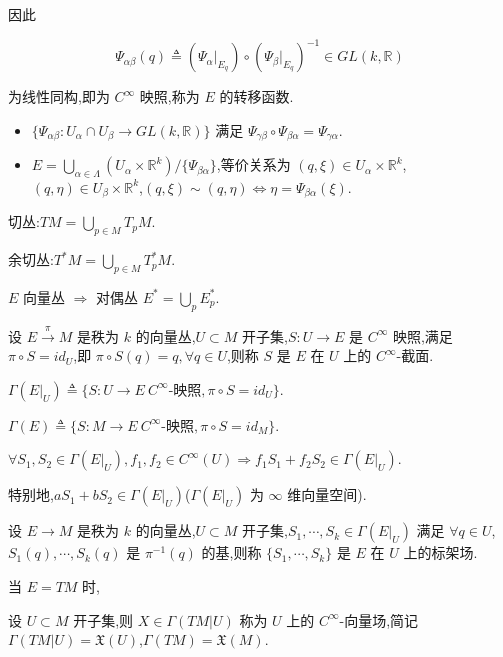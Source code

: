 因此

\[
\Psi_{\alpha \beta}(q) \triangleq \left( \Psi_\alpha |_{E_q} \right) \circ \left( \Psi_\beta |_{E_q} \right)^{-1} \in GL(k, \mathbb{R})
\]

为线性同构,即为 $C^\infty$ 映照,称为 $E$ 的转移函数.

\begin{itemize}
    \item $\{\Psi_{\alpha \beta} : U_\alpha \cap U_\beta \to GL(k, \mathbb{R})\}$ 满足 $\Psi_{\gamma \beta} \circ \Psi_{\beta \alpha} = \Psi_{\gamma \alpha}$.
    \item $E = \bigcup_{\alpha \in \Lambda} (U_\alpha \times \mathbb{R}^k)/\{\Psi_{\beta \alpha}\}$,等价关系为 $(q, \xi) \in U_\alpha \times \mathbb{R}^k$,$(q, \eta) \in U_\beta \times \mathbb{R}^k$,$(q, \xi) \sim (q, \eta) \iff \eta = \Psi_{\beta \alpha}(\xi)$.
\end{itemize}

切丛:$TM = \bigcup_{p \in M} T_pM$.

余切丛:$T^*M = \bigcup_{p \in M} T_p^*M$.

$E$ 向量丛 $\Rightarrow$ 对偶丛 $E^* = \bigcup_p E_p^*$.

\begin{definition}
设 $E \xrightarrow{\pi} M$ 是秩为 $k$ 的向量丛,$U \subset M$ 开子集,$S : U \to E$ 是 $C^\infty$ 映照,满足 $\pi \circ S = id_U$,即 $\pi \circ S(q) = q, \forall q \in U$,则称 $S$ 是 $E$ 在 $U$ 上的 $C^\infty$-截面.
\end{definition}

$\Gamma(E|_U) \triangleq \{S : U \to E \ C^\infty\text{-映照},\pi \circ S = id_U\}$.

$\Gamma(E) \triangleq \{S : M \to E \ C^\infty\text{-映照},\pi \circ S = id_M\}$.

$\forall S_1, S_2 \in \Gamma(E|_U), f_1, f_2 \in C^\infty(U) \Rightarrow f_1 S_1 + f_2 S_2 \in \Gamma(E|_U)$.

特别地,$aS_1 + bS_2 \in \Gamma(E|_U)$($\Gamma(E|_U)$ 为 $\infty$ 维向量空间).

\begin{definition}
设 $E \to M$ 是秩为 $k$ 的向量丛,$U \subset M$ 开子集,$S_1, \cdots, S_k \in \Gamma(E|_U)$ 满足 $\forall q \in U$,$S_1(q), \cdots, S_k(q)$ 是 $\pi^{-1}(q)$ 的基,则称 $\{S_1, \cdots, S_k\}$ 是 $E$ 在 $U$ 上的标架场.
\end{definition}

当 $E = TM$ 时,

\begin{definition}
设 $U \subset M$ 开子集,则 $X \in \Gamma(TM|U)$ 称为 $U$ 上的 $C^\infty$-向量场,简记 $\Gamma(TM|U) = \mathfrak{X}(U)$,$\Gamma(TM) = \mathfrak{X}(M)$.
\end{definition}

